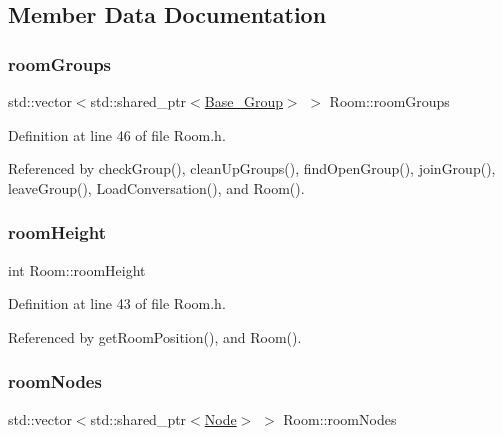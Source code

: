 \subsection{Member Data Documentation}
\mbox{\label{class_room_a2d63fa17f30d50dd5267f04170a662b0}} 
\subsubsection{\texorpdfstring{room\+Groups}{roomGroups}}
{\footnotesize\ttfamily std\+::vector$<$std\+::shared\+\_\+ptr$<$\hyperlink{class_base___group}{Base\+\_\+\+Group}$>$ $>$ Room\+::room\+Groups\hspace{0.3cm}{\ttfamily [private]}}



Definition at line 46 of file Room.\+h.



Referenced by check\+Group(), clean\+Up\+Groups(), find\+Open\+Group(), join\+Group(), leave\+Group(), Load\+Conversation(), and Room().

\mbox{\label{class_room_a3f6fbe94c4c124e4c4df85e57fbb703b}} 
\subsubsection{\texorpdfstring{room\+Height}{roomHeight}}
{\footnotesize\ttfamily int Room\+::room\+Height\hspace{0.3cm}{\ttfamily [private]}}



Definition at line 43 of file Room.\+h.



Referenced by get\+Room\+Position(), and Room().

\mbox{\label{class_room_adcf7b7bd55783c0e80b2508ce9485d78}} 
\subsubsection{\texorpdfstring{room\+Nodes}{roomNodes}}
{\footnotesize\ttfamily std\+::vector$<$std\+::shared\+\_\+ptr$<$\hyperlink{class_node}{Node}$>$ $>$ Room\+::room\+Nodes\hspace{0.3cm}{\ttfamily [private]}}



